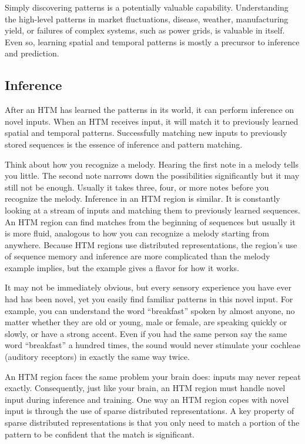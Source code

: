 \documentclass{report}
\begin{document}
Simply discovering patterns is a potentially valuable
capability. Understanding the high-level patterns in market
fluctuations, disease, weather, manufacturing yield, or failures of
complex systems, such as power grids, is valuable in itself. Even so,
learning spatial and temporal patterns is mostly a precursor to
inference and prediction.

\subsection*{Inference}

After an HTM has learned the patterns in its world, it can perform
inference on novel inputs. When an HTM receives input, it will match
it to previously learned spatial and temporal patterns. Successfully
matching new inputs to previously stored sequences is the essence of
inference and pattern matching.

Think about how you recognize a melody. Hearing the first note in a
melody tells you little. The second note narrows down the
possibilities significantly but it may still not be enough. Usually it
takes three, four, or more notes before you recognize the
melody. Inference in an HTM region is similar. It is constantly
looking at a stream of inputs and matching them to previously learned
sequences. An HTM region can find matches from the beginning of
sequences but usually it is more fluid, analogous to how you can
recognize a melody starting from anywhere. Because HTM regions use
distributed representations, the region's use of sequence memory and
inference are more complicated than the melody example implies, but
the example gives a flavor for how it works.

It may not be immediately obvious, but every sensory experience you
have ever had has been novel, yet you easily find familiar patterns in
this novel input. For example, you can understand the word
``breakfast'' spoken by almost anyone, no matter whether they are old
or young, male or female, are speaking quickly or slowly, or have a
strong accent. Even if you had the same person say the same word
``breakfast'' a hundred times, the sound would never stimulate your
cochleae (auditory receptors) in exactly the same way twice.

An HTM region faces the same problem your brain does: inputs may never
repeat exactly. Consequently, just like your brain, an HTM region must
handle novel input during inference and training. One way an HTM
region copes with novel input is through the use of sparse distributed
representations. A key property of sparse distributed representations
is that you only need to match a portion of the pattern to be
confident that the match is significant.
\end{document}
